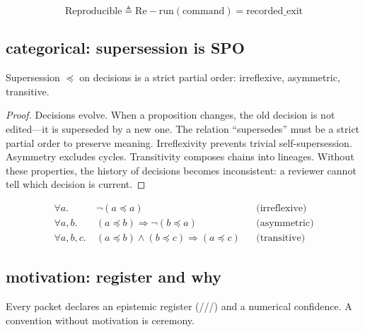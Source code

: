 \begin{theorem}
$$\mathrm{Reproducible} \triangleq \mathrm{Re\!-\!run}(\mathrm{command}) = \mathrm{recorded\_exit}$$
\end{theorem}

\subsection{categorical: supersession is SPO}

\begin{theorem}
Supersession $\preceq$ on decisions is a strict partial order:
irreflexive, asymmetric, transitive.
\end{theorem}

\begin{proof}
Decisions evolve. When a proposition changes, the old decision is not
edited---it is superseded by a new one. The relation ``supersedes''
must be a strict partial order to preserve meaning.
Irreflexivity prevents trivial self-supersession. Asymmetry excludes
cycles. Transitivity composes chains into lineages. Without these
properties, the history of decisions becomes inconsistent: a
reviewer cannot tell which decision is current.
\end{proof}

\begin{theorem}
\begin{align*}
\forall a.\ &\neg(a \preceq a)                              &&\text{(irreflexive)} \\
\forall a, b.\ &(a \preceq b) \Rightarrow \neg(b \preceq a) &&\text{(asymmetric)} \\
\forall a, b, c.\ &(a \preceq b) \wedge (b \preceq c) \Rightarrow (a \preceq c) &&\text{(transitive)}
\end{align*}
\end{theorem}

\subsection{motivation: register and why}

\begin{theorem}
Every packet declares an epistemic register
(///) and
a numerical confidence. A convention without motivation is ceremony.
\end{theorem}

